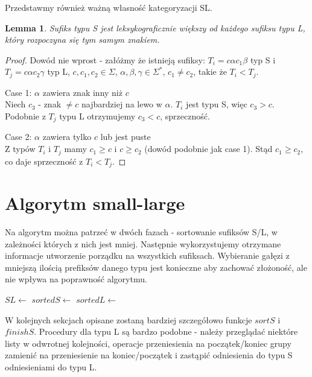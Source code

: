 \documentclass[
12pt
]{article}
\newtheorem{lemma}[theorem]{Lemma}
\theoremstyle{definition}
\theoremstyle{remark}
\begin{document}
Przedstawmy również ważną własność kategoryzacji SL.

\begin{lemma}\label{SL_order}
Sufiks typu S jest leksykograficznie większy od każdego sufiksu typu L, który rozpoczyna się tym samym znakiem.
\end{lemma}
\begin{proof}
Dowód nie wprost - załóżmy że istnieją sufiksy: $T_i = c \alpha c_1 \beta$ typ S i $T_j = c\alpha c_2 \gamma$ typ L, $c, c_1, c_2 \in \Sigma$, $\alpha, \beta, \gamma \in \Sigma^*$, $c_1 \neq c_2$, takie że $T_i < T_j$.

\item[Case 1:] $\alpha$ zawiera znak inny niż $c$\\
Niech $c_3$ - znak $\neq c$ najbardziej na lewo w $\alpha$. $T_i$ jest typu S, więc $c_3>c$. Podobnie z $T_j$ typu L otrzymujemy $c_3<c$, sprzeczność.

\item[Case 2:] $\alpha$ zawiera tylko $c$ lub jest puste\\
Z typów $T_i$ i $T_j$ mamy $c_1 \geq c$ i $c \geq c_2$ (dowód podobnie jak case 1). Stąd $c_1 \geq c_2$, co daje sprzeczność z $T_i < T_j$.

\end{proof}

\section*{Algorytm small-large}

Na algorytm można patrzeć w dwóch fazach - sortowanie sufiksów S/L, w zależności których z nich jest mniej. Następnie wykorzystujemy otrzymane informacje utworzenie porządku na wszystkich sufiksach. Wybieranie gałęzi z mniejszą ilością prefiksów danego typu jest konieczne aby zachować złożoność, ale nie wpływa na poprawność algorytmu.


\begin{algorithmic}
\State $SL \gets$ 
	\State $sortedS \gets$ 
	\State \Return {}
\Else
	\State $sortedL \gets$ 
	\State \Return {}
\EndIf
\EndProcedure
\end{algorithmic}

W kolejnych sekcjach opisane zostaną bardziej szczegółowo funkcje $sortS$ i $finishS$. Procedury dla typu L są bardzo podobne - należy przeglądać niektóre listy w odwrotnej kolejności, operacje przeniesienia na początek/koniec grupy zamienić na przeniesienie na koniec/początek i zastąpić odniesienia do typu S odniesieniami do typu L.
\end{document}

